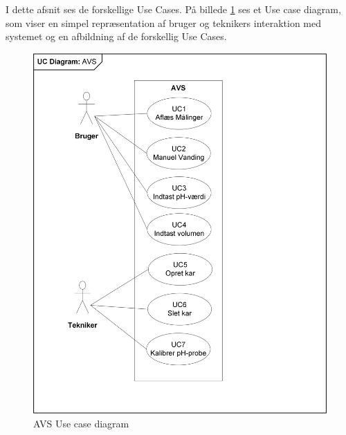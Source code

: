 I dette afsnit ses de forskellige Use Cases. På billede \ref{photo:UseCD} ses et Use case diagram, som viser en simpel repræsentation af bruger og teknikers interaktion med systemet og en afbildning af de forskellig Use Cases. 

\begin{figure}[H]
	\centering
	\includegraphics[scale=1]{Kravspecifikation/UseCases/Photo/AVS_UseCases}
	\caption{AVS Use case diagram}
	\label{photo:UseCD}
\end{figure}

\newpage
